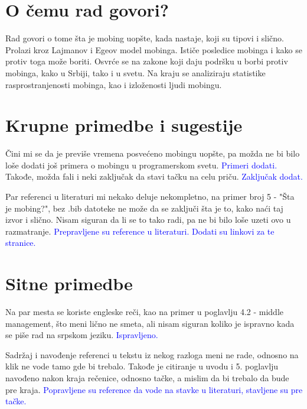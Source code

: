 \documentclass[a4paper]{report}
\newcommand{\odgovor}[1]{\textcolor{blue}{#1}}
\begin{document}
\section{O čemu rad govori?}
Rad govori o tome šta je mobing uopšte, kada nastaje, koji su tipovi i slično. Prolazi kroz Lajmanov i Egeov model mobinga. Ističe posledice mobinga i kako se protiv toga može boriti. Osvrće se na zakone koji daju podršku u borbi protiv mobinga, kako u Srbiji, tako i u svetu. Na kraju se analiziraju statistike rasprostranjenosti mobinga, kao i izloženosti ljudi mobingu.

\section{Krupne primedbe i sugestije}
Čini mi se da je previše vremena posvećeno mobingu uopšte, pa možda ne bi bilo loše dodati još primera o mobingu u programerskom svetu. \odgovor{Primeri dodati.} Takođe, možda fali i neki zaključak da stavi tačku na celu priču. \odgovor{Zaključak dodat.}

Par referenci u literaturi mi nekako deluje nekompletno, na primer broj 5 - "Šta je mobing?", bez .bib datoteke ne može da se zaključi šta je to, kako naći taj izvor i slično. Nisam siguran da li se to tako radi, pa ne bi bilo loše uzeti ovo u razmatranje. \odgovor {Prepravljene su reference u literaturi. Dodati su linkovi za te stranice.}

\section{Sitne primedbe}
Na par mesta se koriste engleske reči, kao na primer u poglavlju 4.2 - middle management, što meni lično ne smeta, ali nisam siguran koliko je ispravno kada se piše rad na srpskom jeziku. \odgovor{Ispravljeno.}

Sadržaj i navođenje referenci u tekstu iz nekog razloga meni ne rade, odnosno na klik ne vode tamo gde bi trebalo. Takođe je citiranje u uvodu i 5. poglavlju navođeno nakon kraja rečenice, odnosno tačke, a mislim da bi trebalo da bude pre kraja. \odgovor{Popravljene su reference da vode na stavke u literaturi, stavljene su pre tačke.}
\end{document}
